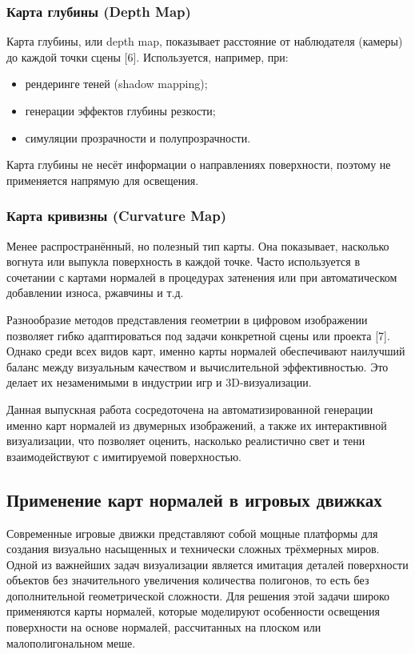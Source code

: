 \subsubsection{Карта глубины (Depth Map)}

Карта глубины, или depth map, показывает расстояние от наблюдателя (камеры) до каждой точки сцены [6]. Используется, например, при:
\begin{itemize}
	\item рендеринге теней (shadow mapping);
	\item генерации эффектов глубины резкости;
	\item симуляции прозрачности и полупрозрачности.
\end{itemize}

Карта глубины не несёт информации о направлениях поверхности, поэтому не применяется напрямую для освещения.
\subsubsection{Карта кривизны (Curvature Map)}

Менее распространённый, но полезный тип карты. Она показывает, насколько вогнута или выпукла поверхность в каждой точке. Часто используется в сочетании с картами нормалей в процедурах затенения или при автоматическом добавлении износа, ржавчины и т.д.

Разнообразие методов представления геометрии в цифровом изображении позволяет гибко адаптироваться под задачи конкретной сцены или проекта [7]. Однако среди всех видов карт, именно карты нормалей обеспечивают наилучший баланс между визуальным качеством и вычислительной эффективностью. Это делает их незаменимыми в индустрии игр и 3D-визуализации.

Данная выпускная работа сосредоточена на автоматизированной генерации именно карт нормалей из двумерных изображений, а также их интерактивной визуализации, что позволяет оценить, насколько реалистично свет и тени взаимодействуют с имитируемой поверхностью. 
\subsection{Применение карт нормалей в игровых движках}

Современные игровые движки представляют собой мощные платформы для создания визуально насыщенных и технически сложных трёхмерных миров. Одной из важнейших задач визуализации является имитация деталей поверхности объектов без значительного увеличения количества полигонов, то есть без дополнительной геометрической сложности. Для решения этой задачи широко применяются карты нормалей, которые моделируют особенности освещения поверхности на основе нормалей, рассчитанных на плоском или малополигональном меше.

